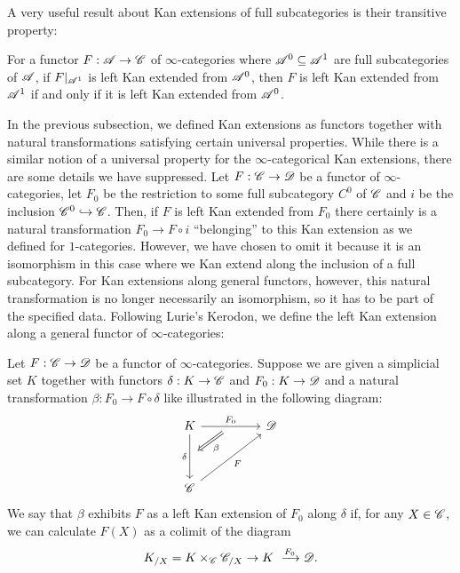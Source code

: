\documentclass[../../thesis.tex]{subfiles}
\begin{document}
A very useful result about Kan extensions of full subcategories is their transitive property:
\begin{proposition}\label{4.3.2.8}
    For a functor $F: \mathscr{A}\to\mathscr{C}$ of $\infty$-categories where $\mathscr{A}^0 \subseteq \mathscr{A}^1$ are full subcategories of $\mathscr{A}$, if $F|_{\mathscr{A}^1}$ is left Kan extended from $\mathscr{A}^0$, then $F$ is left Kan extended from $\mathscr{A}^1$ if and only if it is left Kan extended from $\mathscr{A}^0$.
\end{proposition}
In the previous subsection, we defined Kan extensions as functors together with natural transformations satisfying certain universal properties.
While there is a similar notion of a universal property for the $\infty$-categorical Kan extensions, there are some details we have suppressed.
Let $F : \mathscr{C} \to \mathscr{D}$ be a functor of $\infty$-categories, let $F_0$ be the restriction to some full subcategory $C^{0}$ of $\mathscr{C}$ and $i$ be the inclusion $\mathscr{C}^{0} \hookrightarrow \mathscr{C}$.
Then, if $F$ is left Kan extended from $F_0$ there certainly is a natural transformation $F_0 \to F \circ i$ ``belonging'' to this Kan extension as we defined for $1$-categories. However, we have chosen to omit it because it is an isomorphism in this case where we Kan extend along the inclusion of a full subcategory.
For Kan extensions along general functors, however, this natural transformation is no longer necessarily an isomorphism, so it has to be part of the specified data.
Following Lurie's Kerodon, we define the left Kan extension along a general functor of $\infty$-categories:
\begin{definition}
    Let $F : \mathscr{C} \to \mathscr{D}$ be a functor of $\infty$-categories.
    Suppose we are given a simplicial set $K$ together with functors $\delta : K \to \mathscr{C}$ and $F_0 : K \to \mathscr{D}$ and a natural transformation $\beta : F_0 \to F \circ \delta$ like illustrated in the following diagram:
    \[\begin{tikzcd}
            K && \D \\
            \\
            \C
            \arrow[""{name=0, anchor=center, inner sep=0}, "\delta"', from=1-1, to=3-1]
            \arrow["F"', from=3-1, to=1-3]
            \arrow[""{name=1, anchor=center, inner sep=0}, "{F_0}", from=1-1, to=1-3]
            \arrow["\beta", shorten <=7pt, shorten >=7pt, Rightarrow, from=1, to=0]
        \end{tikzcd}\]
    We say that $\beta$ exhibits $F$ as a left Kan extension of $F_0$ along $\delta$ if, for any $X \in \mathscr{C}$, we can calculate $F(X)$ as a colimit of the diagram
    \[
        K_{/X} = K\times_{\C}\C_{/X} \to K \xrightarrow{F_0} \D  .
    \]
\end{definition}
\end{document}
